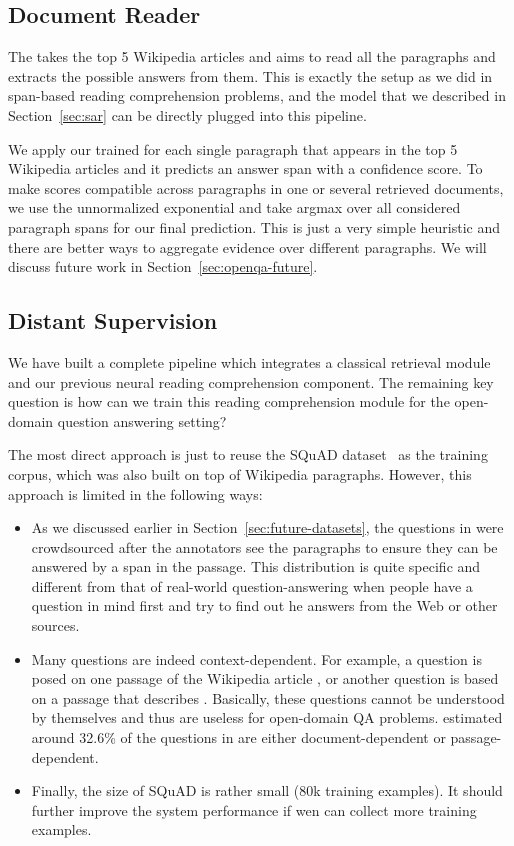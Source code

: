 \subsection{Document Reader}
The  takes the top 5 Wikipedia articles and aims to read all the paragraphs and extracts the possible answers from them. This is exactly the setup as we did in span-based reading comprehension problems, and the  model that we described in Section~\ref{sec:sar} can be directly plugged into this pipeline.

We apply our trained  for each single paragraph that appears in the top 5 Wikipedia articles and it predicts an answer span with a confidence score. To make scores compatible across paragraphs in one or several retrieved documents, we use the unnormalized exponential and take argmax over all considered paragraph spans for our final prediction. This is just a very simple heuristic and there are better ways to aggregate evidence over different paragraphs. We will discuss future work in Section~\ref{sec:openqa-future}.

\subsection{Distant Supervision}
We have built a complete pipeline which integrates a classical retrieval module and our previous neural reading comprehension component. The remaining key question is how can we train this reading comprehension module for the open-domain question answering setting?

The most direct approach is just to reuse the SQuAD dataset~\cite{rajpurkar2016squad} as the training corpus, which was also built on top of Wikipedia paragraphs. However, this approach is limited in the following ways:

\begin{itemize}
    \item
        As we discussed earlier in Section~\ref{sec:future-datasets}, the questions in  were crowdsourced after the annotators see the paragraphs to ensure they can be answered by a span in the passage. This distribution is quite specific and different from that of real-world question-answering when people have a question in mind first and try to find out he answers from the Web or other sources.
    \item
        Many  questions are indeed context-dependent. For example, a question is  posed on one passage of the Wikipedia article , or another question is  based on a passage that describes . Basically, these questions cannot be understood by themselves and thus are useless for open-domain QA problems.  estimated around 32.6\% of the questions in  are either document-dependent or passage-dependent.
    \item
        Finally, the size of SQuAD is rather small (80k training examples). It should further improve the system performance if wen can collect more training examples.
\end{itemize}

